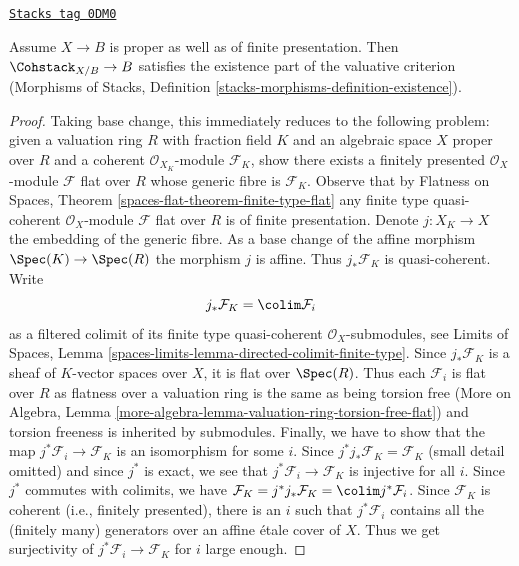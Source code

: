 \begin{lemma}
\label{moduli-lemma-coherent-existence-part}
\href{https://stacks.math.columbia.edu/tag/0DM0}{\texttt{Stacks tag 0DM0}}

Assume $X \to B$ is proper as well as of finite presentation.
Then $\Cohstack_{X/B} \to B$ satisfies the existence part
of the valuative criterion (Morphisms of Stacks, Definition
\ref{stacks-morphisms-definition-existence}).
\end{lemma}

\begin{proof}
Taking base change, this immediately reduces to the following
problem: given a valuation ring $R$ with fraction field $K$ and
an algebraic space $X$ proper over $R$ and a coherent
$\mathcal{O}_{X_K}$-module $\mathcal{F}_K$, show there exists
a finitely presented $\mathcal{O}_X$-module $\mathcal{F}$
flat over $R$ whose generic fibre is $\mathcal{F}_K$.
Observe that by Flatness on Spaces, Theorem
\ref{spaces-flat-theorem-finite-type-flat}
any finite type quasi-coherent $\mathcal{O}_X$-module
$\mathcal{F}$ flat over $R$ is of finite presentation.
Denote $j : X_K \to X$ the embedding of the generic fibre.
As a base change of the affine morphism $\Spec(K) \to \Spec(R)$
the morphism $j$ is affine. Thus $j_*\mathcal{F}_K$ is
quasi-coherent. Write
$$
j_*\mathcal{F}_K = \colim \mathcal{F}_i
$$
as a filtered colimit of its finite type quasi-coherent
$\mathcal{O}_X$-submodules, see
Limits of Spaces, Lemma \ref{spaces-limits-lemma-directed-colimit-finite-type}.
Since $j_*\mathcal{F}_K$ is a sheaf of $K$-vector spaces over $X$,
it is flat over $\Spec(R)$. Thus each $\mathcal{F}_i$ is flat
over $R$ as flatness over a valuation ring is the same as being
torsion free
(More on Algebra, Lemma
\ref{more-algebra-lemma-valuation-ring-torsion-free-flat})
and torsion freeness is inherited by submodules.
Finally, we have to show that the map
$j^*\mathcal{F}_i \to \mathcal{F}_K$
is an isomorphism for some $i$.
Since $j^*j_*\mathcal{F}_K = \mathcal{F}_K$ (small detail omitted)
and since $j^*$ is exact, we see that $j^*\mathcal{F}_i \to \mathcal{F}_K$
is injective for all $i$.
Since $j^*$ commutes with colimits, we have
$\mathcal{F}_K = j^*j_*\mathcal{F}_K = \colim j^*\mathcal{F}_i$.
Since $\mathcal{F}_K$ is coherent (i.e., finitely presented),
there is an $i$ such that $j^*\mathcal{F}_i$ contains all the
(finitely many) generators over an affine \'etale cover of $X$.
Thus we get surjectivity of $j^*\mathcal{F}_i \to \mathcal{F}_K$
for $i$ large enough.
\end{proof}

